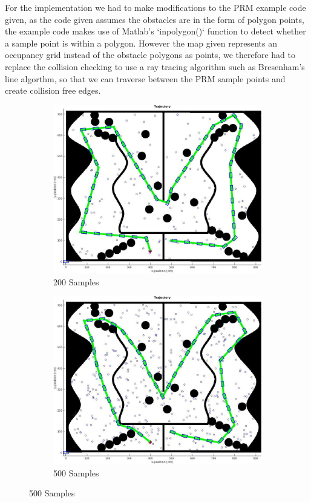 \documentclass{article}
\begin{document}
For the implementation we had to make modifications to the PRM example code given, as the code given assumes the obstacles are in the form of polygon points, the example code makes use of Matlab's `inpolygon()` function to detect whether a sample point is within a polygon. However the map given represents an occupancy grid instead of the obstacle polygons as points, we therefore had to replace the collision checking to use a ray tracing algorithm such as Bresenham's line algorthm, so that we can traverse between the PRM sample points and create collision free edges.

\begin{figure}[H]
	\centering
	\begin{subfigure}[b]{0.49\linewidth}
		\centering
		\includegraphics[width=\textwidth]{images/prm_200.jpg}
		\caption{200 Samples}
	\end{subfigure}
	\begin{subfigure}[b]{0.49\linewidth}
		\centering
		\includegraphics[width=\textwidth]{images/prm_500.jpg}
		\caption{500 Samples}
	\end{subfigure}
	

\end{figure}
\end{document}
